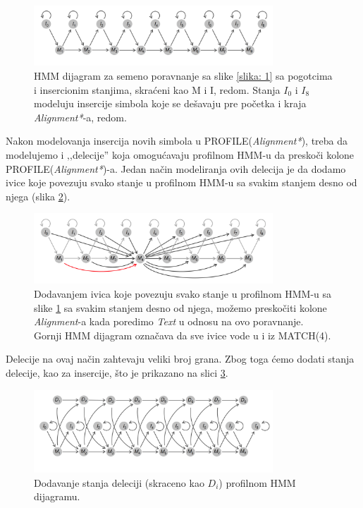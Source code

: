 \begin{figure}[h]
\centering
\includegraphics[width=0.8\textwidth]{poglavlja/10/slike/slika3.png}
\caption{HMM dijagram za semeno poravnanje sa slike \ref{slika: 1} sa pogotcima i insercionim stanjima, skraćeni kao M i I, redom. Stanja $I_0$ i $I_8$ modeluju insercije simbola koje se dešavaju pre početka i kraja \textit{Alignment*}-a, redom.}
\label{slika: 3}
\end{figure}

Nakon modelovanja insercija novih simbola u PROFILE(\textit{Alignment*}), treba da modelujemo i ‚‚delecije'' koja omogućavaju profilnom HMM-u da preskoči kolone PROFILE(\textit{Alignment*})-a. Jedan način modeliranja ovih delecija je da dodamo ivice koje povezuju svako stanje u profilnom HMM-u sa svakim stanjem desno od njega (slika \ref{slika: 4}).


\begin{figure}[h]
\centering
\includegraphics[width=0.8\textwidth]{poglavlja/10/slike/slika4.png}
\caption{Dodavanjem ivica koje povezuju svako stanje u profilnom HMM-u sa slike \ref{slika: 3} sa svakim stanjem desno od njega, možemo preskočiti kolone \textit{Alignment}-a kada poredimo \textit{Text} u odnosu na ovo poravnanje. Gornji HMM dijagram označava da sve ivice vode u i iz MATCH(4).}
\label{slika: 4}
\end{figure}

Delecije na ovaj način zahtevaju veliki broj grana. Zbog toga ćemo dodati stanja delecije, kao za insercije, što je prikazano na slici \ref{slika: 5}.

\begin{figure}[H]
\centering
\includegraphics[width=0.8\textwidth]{poglavlja/10/slike/slika5.png}
\caption{Dodavanje stanja deleciji (skraceno kao $D_i$) profilnom HMM dijagramu.}
\label{slika: 5}
\end{figure}

